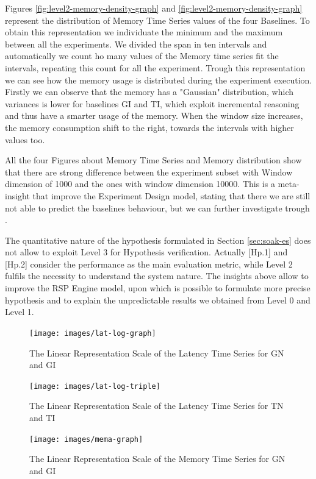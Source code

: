Figures \ref{fig:level2-memory-density-graph} and \ref{fig:level2-memory-density-graph} represent the distribution of Memory Time Series values of the four Baselines. To obtain this representation we individuate the minimum and the maximum between all the experiments. We divided the span in ten intervals and automatically we count ho many values of the Memory time series fit the intervals, repeating this count for all the experiment. Trough this representation we can see how the memory usage is distributed during the experiment execution. Firstly we can observe that the memory has a "Gaussian" distribution, which variances is lower for baselines GI and TI, which exploit incremental reasoning and thus have a smarter usage of the memory. When the window size increases, the memory consumption shift to the right, towards the intervals with higher values too.

All the four Figures about Memory Time Series and Memory distribution show that there are strong difference between the experiment subset with Window dimension of 1000 and the ones with window dimension 10000. This is a meta-insight that improve the Experiment Design model, stating that there we are still not able to predict the baselines behaviour, but we can further investigate trough \namens.

The quantitative nature of the hypothesis formulated in Section \ref{sec:soak-es} does not allow to exploit Level 3 for Hypothesis verification. Actually [Hp.1] and [Hp.2] consider the performance as the main evaluation metric, while Level 2 fulfils the necessity to understand the system nature. The insights above allow to improve the RSP Engine model, upon which is possible to formulate more precise hypothesis and to explain the unpredictable results we obtained from Level 0 and Level 1.

\begin{figure}[hbt]
  \centering
	\texttt{[image: images/lat-log-graph]}
	\caption{The Linear Representation Scale of the Latency Time Series for GN and GI} 
  	\label{fig:level2-latency-graph}
\end{figure}

\begin{figure}[hbt]
  \centering
	\texttt{[image: images/lat-log-triple]}
	\caption{The Linear Representation Scale of the Latency Time Series for TN and TI} 
  	\label{fig:level2-latency-triple}
\end{figure}


\begin{figure}[hbt]
  \centering
	\texttt{[image: images/mema-graph]}
	\caption{The Linear Representation Scale of the Memory Time Series for GN and GI} 
  	\label{fig:level2-memory-graph}
\end{figure}

